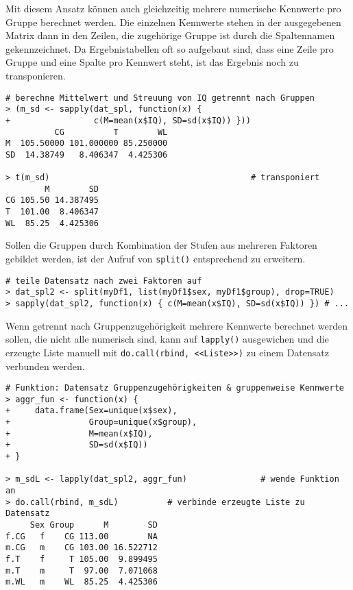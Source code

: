 Mit diesem Ansatz können auch gleichzeitig mehrere numerische Kennwerte pro Gruppe berechnet werden. Die einzelnen Kennwerte stehen in der ausgegebenen Matrix dann in den Zeilen, die zugehörige Gruppe ist durch die Spaltennamen gekennzeichnet. Da Ergebnistabellen oft so aufgebaut sind, dass eine Zeile pro Gruppe und eine Spalte pro Kennwert steht, ist das Ergebnis noch zu transponieren.
\begin{lstlisting}
# berechne Mittelwert und Streuung von IQ getrennt nach Gruppen
> (m_sd <- sapply(dat_spl, function(x) {
+                 c(M=mean(x$IQ), SD=sd(x$IQ)) }))
          CG          T        WL
M  105.50000 101.000000 85.250000
SD  14.38749   8.406347  4.425306

> t(m_sd)                                         # transponiert
        M        SD
CG 105.50 14.387495
T  101.00  8.406347
WL  85.25  4.425306
\end{lstlisting}

Sollen die Gruppen durch Kombination der Stufen aus mehreren Faktoren gebildet werden, ist der Aufruf von \lstinline!split()! entsprechend zu erweitern.
\begin{lstlisting}
# teile Datensatz nach zwei Faktoren auf
> dat_spl2 <- split(myDf1, list(myDf1$sex, myDf1$group), drop=TRUE)
> sapply(dat_spl2, function(x) { c(M=mean(x$IQ), SD=sd(x$IQ)) }) # ...
\end{lstlisting}

Wenn getrennt nach Gruppenzugehörigkeit mehrere Kennwerte berechnet werden sollen, die nicht alle numerisch sind, kann auf \lstinline!lapply()! ausgewichen und die erzeugte Liste manuell mit \lstinline!do.call(rbind, <<Liste>>)! zu einem Datensatz verbunden werden.
\begin{lstlisting}
# Funktion: Datensatz Gruppenzugehörigkeiten & gruppenweise Kennwerte
> aggr_fun <- function(x) {
+     data.frame(Sex=unique(x$sex),
+                Group=unique(x$group),
+                M=mean(x$IQ),
+                SD=sd(x$IQ))
+ }

> m_sdL <- lapply(dat_spl2, aggr_fun)               # wende Funktion an
> do.call(rbind, m_sdL)          # verbinde erzeugte Liste zu Datensatz
     Sex Group      M        SD
f.CG   f    CG 113.00        NA
m.CG   m    CG 103.00 16.522712
f.T    f     T 105.00  9.899495
m.T    m     T  97.00  7.071068
m.WL   m    WL  85.25  4.425306
\end{lstlisting}

